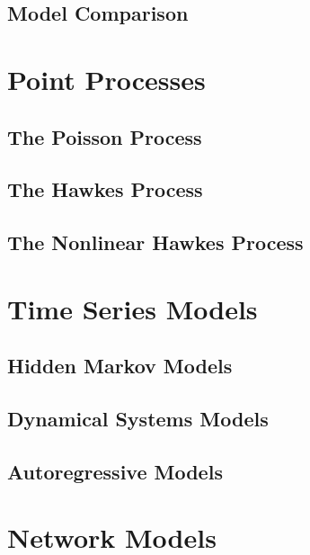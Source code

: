 \subsection{Model Comparison}


\section{Point Processes}

\subsection{The Poisson Process}

\subsection{The Hawkes Process}

\subsection{The Nonlinear Hawkes Process}


\section{Time Series Models}

\subsection{Hidden Markov Models}

\subsection{Dynamical Systems Models}

\subsection{Autoregressive Models}


\section{Network Models}